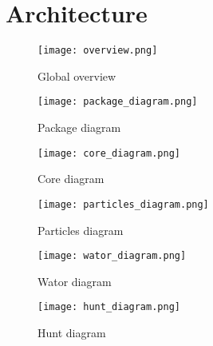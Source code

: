 \section{Architecture}
\label{sec:arch}
\begin{figure}[H]
   \texttt{[image: overview.png]}
   \caption{Global overview}
\end{figure}
\newpage
\begin{figure}[H]
   \texttt{[image: package\_diagram.png]}
   \caption{Package diagram}
\end{figure}
\newpage
\begin{figure}[H]
   \texttt{[image: core\_diagram.png]}
   \caption{Core diagram}
\end{figure}
\newpage
\begin{figure}[H]
   \texttt{[image: particles\_diagram.png]}
   \caption{Particles diagram}
\end{figure}
\newpage
\begin{figure}[H]
   \texttt{[image: wator\_diagram.png]}
   \caption{Wator diagram}
\end{figure}
\newpage

\begin{figure}[H]
   \texttt{[image: hunt\_diagram.png]}
   \caption{Hunt diagram}
\end{figure}

\newpage